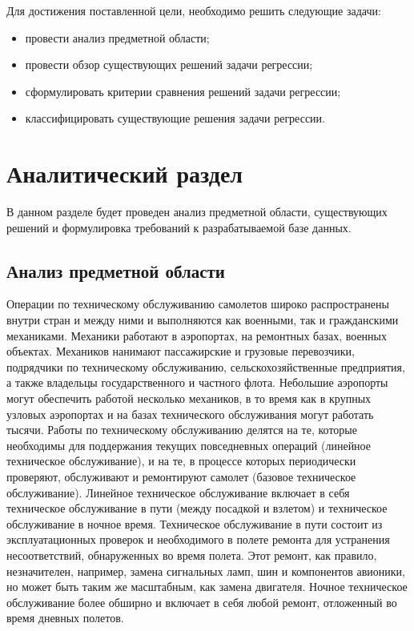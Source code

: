 Для достижения поставленной цели, необходимо решить следующие задачи:
\begin{itemize}
    \item провести анализ предметной области;
    \item провести обзор существующих решений задачи регрессии;
    \item сформулировать критерии сравнения решений задачи регрессии;
    \item классифицировать существующие решения задачи регрессии.
\end{itemize}

\chapter{Аналитический раздел}

В данном разделе будет проведен анализ предметной области, существующих решений и формулировка требований к разрабатываемой базе данных.

\section{Анализ предметной области}

Операции по техническому обслуживанию самолетов широко распространены внутри стран и между ними и выполняются как военными, так и гражданскими механиками.
Механики работают в аэропортах, на ремонтных базах, военных объектах.
Механиков нанимают пассажирские и грузовые перевозчики, подрядчики по техническому обслуживанию, сельскохозяйственные предприятия, а также владельцы государственного и частного флота.
Небольшие аэропорты могут обеспечить работой несколько механиков, в то время как в крупных узловых аэропортах и на базах технического обслуживания могут работать тысячи.
Работы по техническому обслуживанию делятся на те, которые необходимы для поддержания текущих повседневных операций (линейное техническое обслуживание), и на те, в процессе которых периодически проверяют, обслуживают и ремонтируют самолет (базовое техническое обслуживание).
Линейное техническое обслуживание включает в себя техническое обслуживание в пути (между посадкой и взлетом) и техническое обслуживание в ночное время.
Техническое обслуживание в пути состоит из эксплуатационных проверок и необходимого в полете ремонта для устранения несоответствий, обнаруженных во время полета.
Этот ремонт, как правило, незначителен, например, замена сигнальных ламп, шин и компонентов авионики, но может быть таким же масштабным, как замена двигателя.
Ночное техническое обслуживание более обширно и включает в себя любой ремонт, отложенный во время дневных полетов.

